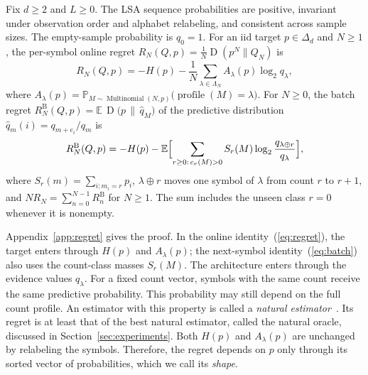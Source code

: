 \documentclass[anon]{alt2027}
\newcommand{\batchreg}{R^{\mathrm{B}}}
\newcommand{\simplex}{\Delta_d}
\newcommand{\Mult}{\operatorname{Multinomial}}
\newcommand{\profile}{\operatorname{profile}}
\newcommand{\E}{\mathbb{E}}
\newcommand{\Prob}{\mathbb{P}}
\newcommand{\KL}{\operatorname{D}}
\renewcommand{\eqref}[1]{(\ref{#1})}
\begin{document}
\begin{theorem}
\label{thm:regret}
Fix $d\ge2$ and $L\ge0$. The LSA sequence probabilities are positive, invariant under observation order and alphabet relabeling, and consistent across sample sizes. The empty-sample probability is $q_0=1$. For an iid target $p\in\simplex$ and $N\ge1$, the per-symbol online regret $R_N(Q,p)=\frac1N\KL(p^N\|Q_N)$ is
\begin{equation}
\label{eq:regret}
R_N(Q,p)=-H(p)-\frac1N\sum_{\lambda\in\Lambda_N}A_\lambda(p)\log_2 q_\lambda,
\end{equation}
where $A_\lambda(p)=\Prob_{M\sim\Mult(N,p)}\bigl(\profile(M)=\lambda\bigr)$.
For $N\ge0$, the batch regret $\batchreg_N(Q,p)=\E\,\KL\bigl(p\,\|\,\hat q_{M}\bigr)$ of the predictive distribution $\hat q_m(i)=q_{m+e_i}/q_m$ is
\begin{equation}
\label{eq:batch}
\batchreg_N(Q,p)=-H(p)-\E\Bigl[\sum_{\substack{r\ge0:\,c_r(M)>0}}S_r(M)\log_2\frac{q_{\lambda\oplus r}}{q_\lambda}\Bigr],
\end{equation}
where $S_r(m)=\sum_{i:m_i=r}p_i$, $\lambda\oplus r$ moves one symbol of $\lambda$ from count $r$ to $r+1$, and $NR_N=\sum_{n=0}^{N-1}\batchreg_n$ for $N\ge1$. The sum includes the unseen class $r=0$ whenever it is nonempty.
\end{theorem}
Appendix~\ref{app:regret} gives the proof. In the online identity~\eqref{eq:regret}, the target enters through $H(p)$ and $A_\lambda(p)$; the next-symbol identity~\eqref{eq:batch} also uses the count-class masses $S_r(M)$. The architecture enters through the evidence values $q_\lambda$. For a fixed count vector, symbols with the same count receive the same predictive probability. This probability may still depend on the full count profile. An estimator with this property is called a \emph{natural estimator}~\citep{orlitsky2015competitive}. Its regret is at least that of the best natural estimator, called the natural oracle, discussed in Section~\ref{sec:experiments}. Both $H(p)$ and $A_\lambda(p)$ are unchanged by relabeling the symbols. Therefore, the regret depends on $p$ only through its sorted vector of probabilities, which we call its \emph{shape}.
\end{document}
